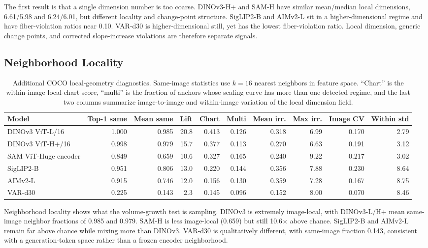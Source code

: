 \documentclass{article}
\newcommand{\dataset}[1]{\textsc{#1}}
\begin{document}
The first result is that a single dimension number is too coarse. DINOv3-H+ and SAM-H have similar mean/median local dimensions, 6.61/5.98 and 6.24/6.01, but different locality and change-point structure. SigLIP2-B and AIMv2-L sit in a higher-dimensional regime and have fiber-violation ratios near 0.10. VAR-d30 is higher-dimensional still, yet has the lowest fiber-violation ratio. Local dimension, generic change points, and corrected slope-increase violations are therefore separate signals.

\subsection{Neighborhood Locality}
\begin{table}[H]
\centering
\scriptsize
\caption{Additional \dataset{COCO} local-geometry diagnostics. Same-image statistics use $k=16$ nearest neighbors in feature space. ``Chart'' is the within-image local-chart score, ``multi'' is the fraction of anchors whose scaling curve has more than one detected regime, and the last two columns summarize image-to-image and within-image variation of the local dimension field.}
\begin{tabular}{@{}lrrrrrrrrr@{}}
\toprule
Model & Top-1 same & Mean same & Lift & Chart & Multi & Mean irr. & Max irr. & Image CV & Within std \\
\midrule
DINOv3 ViT-L/16 & 1.000 & 0.985 & 20.8 & 0.413 & 0.126 & 0.318 & 6.99 & 0.170 & 2.79 \\
DINOv3 ViT-H+/16 & 0.998 & 0.979 & 15.7 & 0.377 & 0.113 & 0.270 & 6.63 & 0.191 & 3.12 \\
SAM ViT-Huge encoder & 0.849 & 0.659 & 10.6 & 0.327 & 0.165 & 0.240 & 9.22 & 0.217 & 3.02 \\
SigLIP2-B & 0.951 & 0.806 & 13.0 & 0.220 & 0.144 & 0.356 & 7.88 & 0.230 & 8.64 \\
AIMv2-L & 0.915 & 0.746 & 12.0 & 0.156 & 0.130 & 0.359 & 7.28 & 0.167 & 8.75 \\
VAR-d30 & 0.225 & 0.143 & 2.3 & 0.145 & 0.096 & 0.152 & 8.00 & 0.070 & 8.46 \\
\bottomrule
\end{tabular}
\label{tab:coco-vit-sam-local}
\end{table}

Neighborhood locality shows what the volume-growth test is sampling. DINOv3 is extremely image-local, with DINOv3-L/H+ mean same-image neighbor fractions of 0.985 and 0.979. SAM-H is less image-local (0.659) but still 10.6$\times$ above chance. SigLIP2-B and AIMv2-L remain far above chance while mixing more than DINOv3. VAR-d30 is qualitatively different, with same-image fraction 0.143, consistent with a generation-token space rather than a frozen encoder neighborhood.
\end{document}
